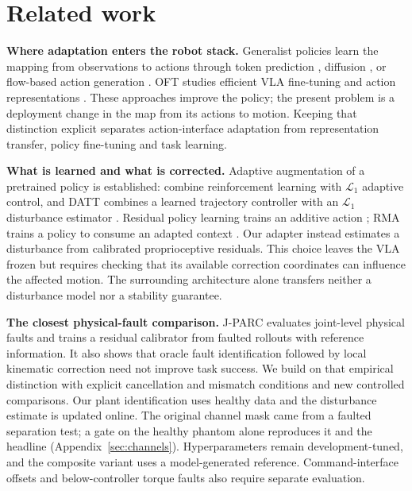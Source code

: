 \documentclass{article}
\begin{document}
\section{Related work}
\label{sec:related}
\textbf{Where adaptation enters the robot stack.} Generalist policies learn the mapping
from observations to actions through token prediction \citep{rt2,openvla}, diffusion
\citep{diffusionpolicy,octo}, or flow-based action generation \citep{pi0,pi05}.
OFT studies efficient VLA fine-tuning and action representations \citep{openvlaoft}.
These approaches improve the policy; the present problem is a deployment change in the
map from its actions to motion. Keeping that distinction explicit separates action-interface
adaptation from representation transfer, policy fine-tuning and task learning.

\textbf{What is learned and what is corrected.} Adaptive augmentation of a pretrained policy
is established: \citet{cheng2022l1rl} combine reinforcement learning with $\mathcal L_1$
adaptive control, and DATT combines a learned trajectory controller with an $\mathcal L_1$
disturbance estimator \citep{huang2023datt}. Residual policy learning trains an additive action
\citep{silver2018residual,johannink2019residual}; RMA trains a policy to consume an adapted
context \citep{kumar2021rma}. Our adapter instead estimates a disturbance from calibrated
proprioceptive residuals. This choice leaves the VLA frozen but requires checking that its
available correction coordinates can influence the affected motion. The surrounding
architecture alone transfers neither a disturbance model nor a stability guarantee.

\textbf{The closest physical-fault comparison.} J-PARC \citep{jparc2026} evaluates joint-level physical
faults and trains a residual calibrator from faulted rollouts with reference information.
It also shows that oracle fault identification followed by local kinematic correction need
not improve task success. We build on that empirical distinction with explicit cancellation
and mismatch conditions and new controlled comparisons. Our plant identification uses healthy data and the disturbance estimate is updated online.
The original channel mask came from a faulted separation test; a gate on the healthy phantom
alone reproduces it and the headline (Appendix~\ref{sec:channels}). Hyperparameters remain
development-tuned, and the composite variant uses a model-generated reference. Command-interface offsets and below-controller torque faults
also require separate evaluation.
\end{document}
